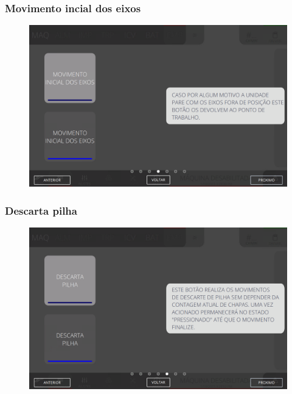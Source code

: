 \newpage
\thispagestyle{fancy}
\vspace*{40 pt}
\subsubsection{\small{Movimento incial dos eixos}} \label{sec:telaComandosEmpilhadorMovimentoInicialEixos}
\vspace*{\fill}
\begin{figure}[h]
    \centering
    \includegraphics[width=576 px,height=360 px]{src/imagesICV/08-stacker/commands/e-9.png}
\end{figure}
\vspace*{\fill}

\newpage
\thispagestyle{fancy}
\vspace*{40 pt}
\subsubsection{\small{Descarta pilha}} \label{sec:telaComandosEmpilhadorDescartaPilha}
\vspace*{\fill}
\begin{figure}[h]
    \centering
    \includegraphics[width=576 px,height=360 px]{src/imagesICV/08-stacker/commands/e-10.png}
\end{figure}
\vspace*{\fill}

